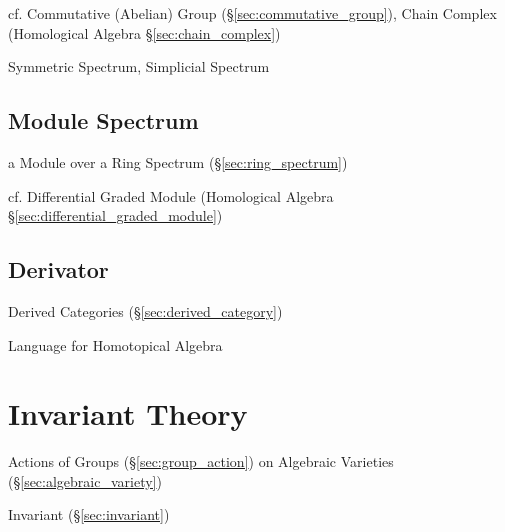 cf. Commutative (Abelian) Group (\S\ref{sec:commutative_group}), Chain Complex
(Homological Algebra \S\ref{sec:chain_complex})

Symmetric Spectrum, Simplicial Spectrum



\subsection{Module Spectrum}\label{sec:module_spectrum}

a Module over a Ring Spectrum (\S\ref{sec:ring_spectrum})

cf. Differential Graded Module (Homological Algebra
\S\ref{sec:differential_graded_module})



\subsection{Derivator}\label{sec:derivator}

Derived Categories (\S\ref{sec:derived_category})

Language for Homotopical Algebra



\section{Invariant Theory}\label{sec:invariant_theory}

Actions of Groups (\S\ref{sec:group_action}) on Algebraic Varieties
(\S\ref{sec:algebraic_variety})

Invariant (\S\ref{sec:invariant})

